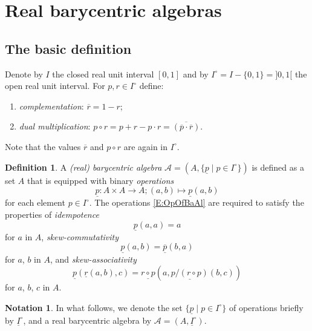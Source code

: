 \documentclass[12pt]{amsart}
\theoremstyle{plain}
\theoremstyle{definition}
\newtheorem{definition}[theorem]{Definition}
\newtheorem{notation}[theorem]{Notation}
\numberwithin{equation}{section}
\begin{document}
\section{Real barycentric algebras}\label{S:rba}
\subsection{The basic definition}
Denote by $I$ the closed real unit interval $[0,1]$ and by $I^{\circ}=I-\{0,1\}=]0,1[$ the open real unit interval.
For $p,r\in I^{\circ}$ define:
\begin{enumerate}
\item[$(\mathrm a)$] \emph{complementation}: $\overline{r}=1-r$;
\item[$(\mathrm b)$] \emph{dual multiplication}: $p\circ r=p+r-p\cdot r= \overline{(\overline p\cdot \overline r)}$.
\end{enumerate}
Note that the values $\overline{r}$ and $p\circ r$ are again in $I^{\circ}$.

\begin{definition}\cite{RS85,Sm11,Modes}
A \emph{(real) barycentric algebra} $\mathcal{A}=(A,\{\underline{p}\mid p\in I^{\circ}\})$ is defined as a 
set $A$ that is equipped with binary \emph{operations}
\begin{equation}\label{E:OpOfBaAl}
\underline{p}\colon A\times A\to A;(a,b)\mapsto \underline{p}(a,b)
\end{equation}
for each element $p\in I^{\circ}$. The operations \eqref{E:OpOfBaAl} are required to satisfy the properties of \emph{idempotence}
\begin{equation}\label{E:idemptnc}
\underline{p}(a,a)=a
\end{equation}
for $a$ in $A$, \emph{skew-commutativity}
\begin{equation}\label{E:skewcomm}
\underline{p}(a,b)=\underline{\overline{p}}(b,a)
\end{equation}
for $a$, $b$ in $A$, and \emph{skew-associativity}
\begin{equation}\label{E:skewasoc}
\underline{p}(\underline{r}(a,b),c)=\underline{r\circ p}(a,\underline{p/(r\circ p)}(b,c))
\end{equation}
for $a$, $b$, $c$ in $A$.
\end{definition}

\begin{notation}
In what follows, we denote the set $\{\underline{p}\mid p\in I^{\circ}\}$ of operations briefly by $\underline{I}^{\circ}$, and a real barycentric algebra by $\mathcal{A}=(A,\underline{I}^{\circ})$.
\end{notation}
\end{document}
